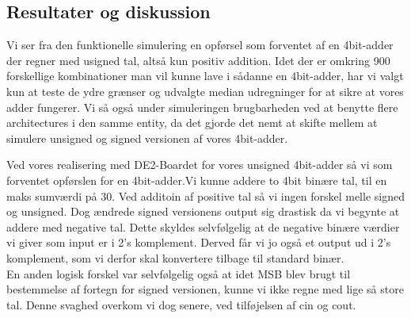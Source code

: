 \documentclass[../journal2.tex]{subfiles}
\begin{document}
\begin{table}[H]
    \centering
      \framebox{
        \rule{8pt}{0pt}
          
}
  \caption{Kode for 4bit-adder med unsigned og signed architecture, c\textunderscore in}	
  \label{src:Tab41}
\end{table}


\subsection{Resultater og diskussion}

Vi ser fra den funktionelle simulering en opførsel som forventet af en 4bit-adder der regner med usigned tal, altså kun positiv addition. Idet der er omkring 900 forskellige kombinationer man vil kunne lave i sådanne en 4bit-adder, har vi valgt kun at teste de ydre grænser og udvalgte median udregninger for at sikre at vores adder fungerer. Vi så også under simuleringen brugbarheden ved at benytte flere architectures i den samme entity, da det gjorde det nemt at skifte mellem at simulere unsigned og signed versionen af vores 4bit-adder.


Ved vores realisering med DE2-Boardet for vores unsigned 4bit-adder så vi som forventet opførslen for en 4bit-adder.Vi kunne addere to 4bit binære tal, til en maks sumværdi på 30. Ved additoin af positive tal så vi ingen forskel melle signed og unsigned. Dog ændrede signed versionens output sig drastisk da vi begynte at addere med negative tal. Dette skyldes selvfølgelig at de negative binære værdier vi giver som input er i 2's komplement. Derved får vi jo også et output ud i 2's komplement, som vi derfor skal konvertere tilbage til standard binær.\\
En anden logisk forskel var selvfølgelig også at idet MSB blev brugt til bestemmelse af fortegn for signed versionen, kunne vi ikke regne med lige så store tal. Denne svaghed overkom vi dog senere, ved tilføjelsen af c\textunderscore in og c\textunderscore out.

\end{document}
